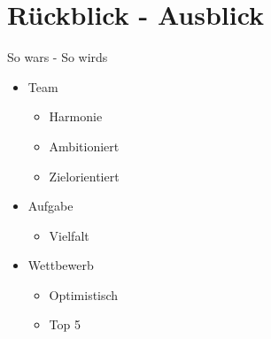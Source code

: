 \section{Rückblick - Ausblick} %
\begin{frame}
    \begin{block}{So wars - So wirds}
        \begin{itemize}
            \item Team
            \begin{itemize}
                \item Harmonie
                \item Ambitioniert
                \item Zielorientiert
            \end{itemize}
            \item Aufgabe
            \begin{itemize}
                \item Vielfalt
            \end{itemize}
            \item Wettbewerb
            \begin{itemize}
                \item Optimistisch
                \item Top 5
            \end{itemize}
        \end{itemize}
    \end{block}
\end{frame}
